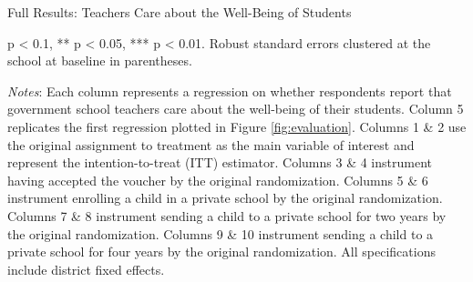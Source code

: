 \documentclass[hidelinks, 12pt, titlepage]{article}
\begin{document}
				\begin{landscape}

				\begin{table}
					\begin{threeparttable}
						\centering
						\caption{Full Results: Teachers Care about the Well-Being of Students\label{table:appendixteacherscare}}
						
						\begin{tablenotes}
							\item * p < 0.1, ** p < 0.05, *** p < 0.01. Robust standard errors clustered at the school at baseline in parentheses.
							\item \emph{Notes}: Each column represents a regression on whether respondents report that government school teachers care about the well-being of their students.  Column 5 replicates the first regression plotted in Figure \ref{fig:evaluation}.  Columns 1 \& 2 use the original assignment to treatment as the main variable of interest and represent the intention-to-treat (ITT) estimator.  Columns 3 \& 4 instrument having accepted the voucher by the original randomization.  Columns 5 \& 6 instrument enrolling a child in a private school by the original randomization.  Columns 7 \& 8 instrument sending a child to a private school for two years by the original randomization.  Columns 9 \& 10 instrument sending a child to a private school for four years by the original randomization.  All specifications include district fixed effects.
						\end{tablenotes}
					\end{threeparttable}
				\end{table}

				\clearpage


\end{landscape}
\end{document}
